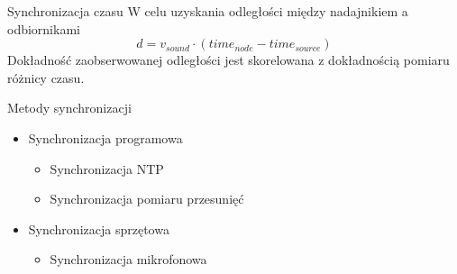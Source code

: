 \begin{frame}
    \begin{block}{Synchronizacja czasu}
        W celu uzyskania odległości między nadajnikiem a odbiornikami 
        \[d = v_{sound} \cdot (time_{node} - time_{source})\]
        Dokładność zaobserwowanej odległości jest skorelowana z dokładnością pomiaru różnicy czasu.
    \end{block}
    \begin{block}{Metody synchronizacji}
        \begin{itemize}
            \item Synchronizacja programowa
                \begin{itemize}
                    \item Synchronizacja NTP
                    \item Synchronizacja pomiaru przesunięć
                \end{itemize}
            \item Synchronizacja sprzętowa
                \begin{itemize}
                    \item Synchronizacja mikrofonowa
                \end{itemize}
        \end{itemize}
    \end{block}

\end{frame}